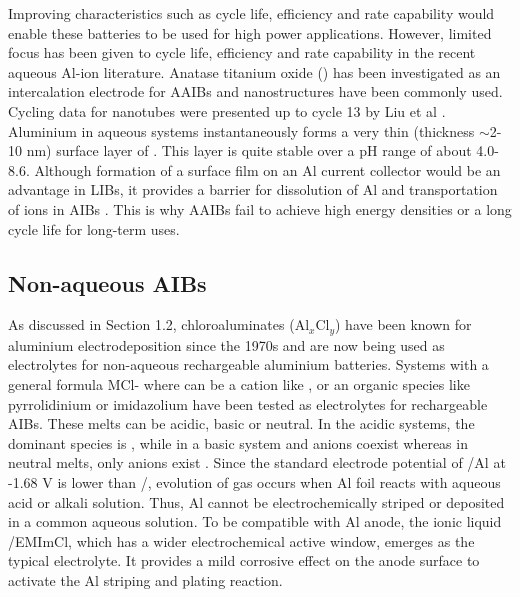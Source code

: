 Improving characteristics such as cycle life, efficiency and rate capability would enable these batteries to be used for high power applications. However, limited focus has been given to cycle life, efficiency and rate capability in the recent aqueous Al-ion literature. Anatase titanium oxide () has been investigated as an intercalation electrode for AAIBs and  nanostructures have been commonly used. Cycling data for  nanotubes were presented up to cycle 13 by Liu et al \cite{liu_aluminum_2012}.  %
Aluminium in aqueous systems instantaneously forms a very thin (thickness $\sim$2-10 nm) surface layer of  \cite{vargel_translated_2004}. This layer is quite stable over a pH range of about 4.0-8.6. Although formation of a surface film on an Al current collector would be an advantage in LIBs, it provides a barrier for dissolution of Al and transportation of  ions in AIBs \cite{myung_electrochemical_2011}. This is why AAIBs fail to achieve high energy densities or a long cycle life for long-term uses.

\subsection{Non-aqueous AIBs}
As discussed in Section 1.2, chloroaluminates (Al$_x$Cl$_y$) have been known for aluminium electrodeposition since the 1970s and are now being used as electrolytes for non-aqueous rechargeable aluminium batteries\cite{weppner_ionic_1976, fung_reaction_1972}. Systems with a general formula MCl- where  can be a cation like ,  or an organic species like pyrrolidinium or imidazolium have been tested as electrolytes for rechargeable AIBs\cite{das_aluminium-ion_2017}. These melts can be acidic, basic or neutral. In the acidic systems, the dominant species is , while in a basic system  and  anions coexist whereas in neutral melts, only  anions exist \cite{galinski_ionic_2006,holbrey_ionic_1999}. Since the standard electrode potential of /Al at -1.68 V is lower than /, evolution of  gas occurs when Al foil reacts with aqueous acid or alkali solution. Thus, Al cannot be electrochemically striped or deposited in a common aqueous solution. To be compatible with Al anode, the ionic liquid /EMImCl, which has a wider electrochemical active window, emerges as the typical electrolyte. It provides a mild corrosive effect on the anode surface to activate the Al striping and plating reaction. 

